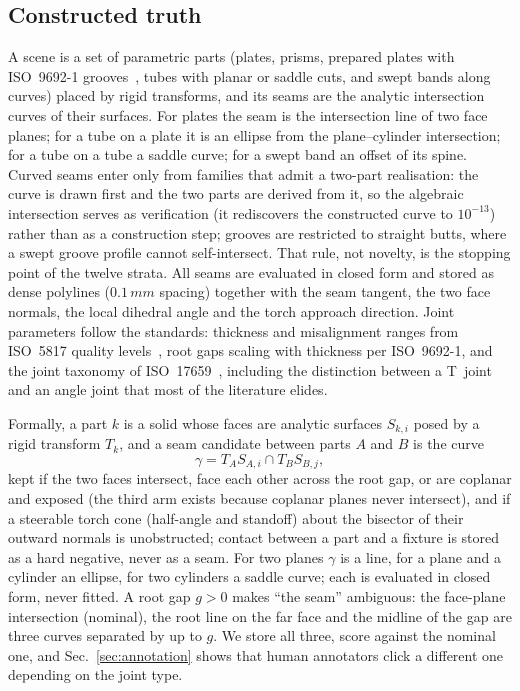 \documentclass[letterpaper, 10 pt, conference]{ieeeconf}
\newcommand{\mm}{\,mm}
\begin{document}
\subsection{Constructed truth}
A scene is a set of parametric parts (plates, prisms, prepared plates with ISO~9692-1 grooves~\cite{iso9692}, tubes with planar or saddle cuts, and swept bands along curves) placed by rigid transforms, and its seams are the analytic intersection curves of their surfaces. For plates the seam is the intersection line of two face planes; for a tube on a plate it is an ellipse from the plane--cylinder intersection; for a tube on a tube a saddle curve; for a swept band an offset of its spine. Curved seams enter only from families that admit a two-part realisation: the curve is drawn first and the two parts are derived from it, so the algebraic intersection serves as verification (it rediscovers the constructed curve to $10^{-13}$) rather than as a construction step; grooves are restricted to straight butts, where a swept groove profile cannot self-intersect. That rule, not novelty, is the stopping point of the twelve strata. All seams are evaluated in closed form and stored as dense polylines ($0.1\mm$ spacing) together with the seam tangent, the two face normals, the local dihedral angle and the torch approach direction. Joint parameters follow the standards: thickness and misalignment ranges from ISO~5817 quality levels~\cite{iso5817}, root gaps scaling with thickness per ISO~9692-1, and the joint taxonomy of ISO~17659~\cite{iso17659}, including the distinction between a T~joint and an angle joint that most of the literature elides.

Formally, a part $k$ is a solid whose faces are analytic surfaces $S_{k,i}$ posed by a rigid transform $T_k$, and a seam candidate between parts $A$ and $B$ is the curve
\begin{equation}
\gamma = T_A S_{A,i} \cap T_B S_{B,j},
\label{eq:seam}
\end{equation}
kept if the two faces intersect, face each other across the root gap, or are coplanar and exposed (the third arm exists because coplanar planes never intersect), and if a steerable torch cone (half-angle and standoff) about the bisector of their outward normals is unobstructed; contact between a part and a fixture is stored as a hard negative, never as a seam. For two planes $\gamma$ is a line, for a plane and a cylinder an ellipse, for two cylinders a saddle curve; each is evaluated in closed form, never fitted. A root gap $g>0$ makes ``the seam'' ambiguous: the face-plane intersection (nominal), the root line on the far face and the midline of the gap are three curves separated by up to $g$. We store all three, score against the nominal one, and Sec.~\ref{sec:annotation} shows that human annotators click a different one depending on the joint type.
\end{document}
